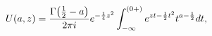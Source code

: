 \[\mathop{U\/}\nolimits\!\left(a,z\right)=\frac{\mathop{\Gamma\/}\nolimits\!%
\left(\frac{1}{2}-a\right)}{2\pi i}e^{-\frac{1}{4}z^{2}}\int_{-\infty}^{(0+)}e%
^{zt-\frac{1}{2}t^{2}}t^{a-\frac{1}{2}}dt,\]